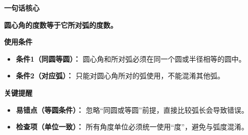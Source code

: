 \begin{summarybox}
	\textbf{\textcolor{CSummary}{一句话核心}}

	\textbf{圆心角的度数等于它所对弧的度数。}

	\medskip
	\textbf{\textcolor{CSummary}{使用条件}}
	\begin{itemize}[leftmargin=*, itemsep=0.5em, topsep=0.4em]
		\item \textbf{条件1（同圆等圆）：} 圆心角和所对弧必须在同一个圆或半径相等的圆中。
		\item \textbf{条件2（对应弧）：} 只能对圆心角所对的弧使用，不能混淆其他弧。
	\end{itemize}

	\medskip
	\textbf{\textcolor{CSummary}{关键提醒}}
	\begin{itemize}[leftmargin=*, itemsep=0.5em, topsep=0.4em]
		\item \textbf{易错点（等圆条件）：} 忽略“同圆或等圆”前提，直接比较弧长会导致错误。
		\item \textbf{检查项（单位一致）：} 所有角度单位必须统一使用“度”，避免与弧度混淆。
	\end{itemize}
\end{summarybox}
